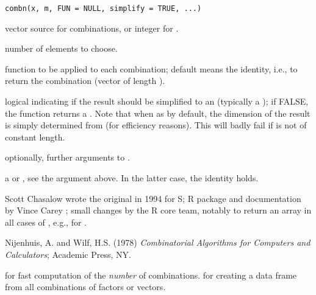 %
\begin{Usage}
\begin{verbatim}
combn(x, m, FUN = NULL, simplify = TRUE, ...)
\end{verbatim}
\end{Usage}
%
\begin{Arguments}
\begin{ldescription}
\item[\code{x}] vector source for combinations, or integer  for
.
\item[\code{m}] number of elements to choose.
\item[\code{FUN}] function to be applied to each combination; default
 means the identity, i.e., to return the combination
(vector of length ).
\item[\code{simplify}] logical indicating if the result should be simplified
to an  (typically a ); if
FALSE, the function returns a .  Note that when
 as by default, the dimension of the result is
simply determined from  (for
efficiency reasons).  This will badly fail if  is not of
constant length.
\item[\code{...}] optionally, further arguments to .
\end{ldescription}
\end{Arguments}
%
\begin{Value}
a  or , see the 
argument above.  In the latter case, the identity
 holds.
\end{Value}
%
\begin{Author}\relax
Scott Chasalow wrote the original in 1994 for S;
R package  and documentation by Vince Carey
;
small changes by the R core team, notably to return an array in all
cases of , e.g., for .
\end{Author}
%
\begin{References}\relax
Nijenhuis, A. and Wilf, H.S. (1978)
\emph{Combinatorial Algorithms for Computers and Calculators};
Academic Press, NY.
\end{References}
%
\begin{SeeAlso}\relax
{} for fast computation of the \emph{number} of
combinations.  for creating a data frame from
all combinations of factors or vectors.
\end{SeeAlso}
